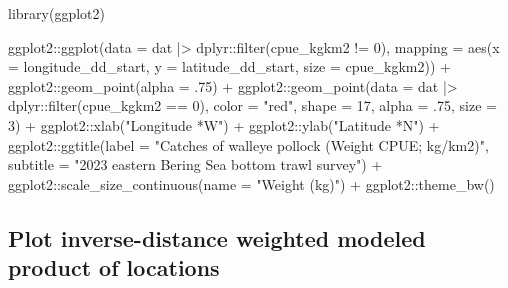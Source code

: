 \documentclass[
  letterpaper,
  oneside,
  open=any]{scrbook}
\newenvironment{Shaded}{\begin{snugshade}}{\end{snugshade}}
\newcommand{\AttributeTok}[1]{\textcolor[rgb]{0.40,0.45,0.13}{#1}}
\newcommand{\DecValTok}[1]{\textcolor[rgb]{0.68,0.00,0.00}{#1}}
\newcommand{\FunctionTok}[1]{\textcolor[rgb]{0.28,0.35,0.67}{#1}}
\newcommand{\NormalTok}[1]{\textcolor[rgb]{0.00,0.23,0.31}{#1}}
\newcommand{\SpecialCharTok}[1]{\textcolor[rgb]{0.37,0.37,0.37}{#1}}
\newcommand{\StringTok}[1]{\textcolor[rgb]{0.13,0.47,0.30}{#1}}
\begin{document}
\begin{Shaded}
\begin{Highlighting}[]
\FunctionTok{library}\NormalTok{(ggplot2)}

\NormalTok{ggplot2}\SpecialCharTok{::}\FunctionTok{ggplot}\NormalTok{(}\AttributeTok{data =}\NormalTok{ dat }\SpecialCharTok{|\textgreater{}}\NormalTok{ dplyr}\SpecialCharTok{::}\FunctionTok{filter}\NormalTok{(cpue\_kgkm2 }\SpecialCharTok{!=} \DecValTok{0}\NormalTok{), }
                \AttributeTok{mapping =} \FunctionTok{aes}\NormalTok{(}\AttributeTok{x =}\NormalTok{ longitude\_dd\_start, }
                              \AttributeTok{y =}\NormalTok{ latitude\_dd\_start, }
                              \AttributeTok{size =}\NormalTok{ cpue\_kgkm2)) }\SpecialCharTok{+} 
\NormalTok{  ggplot2}\SpecialCharTok{::}\FunctionTok{geom\_point}\NormalTok{(}\AttributeTok{alpha =}\NormalTok{ .}\DecValTok{75}\NormalTok{) }\SpecialCharTok{+}
\NormalTok{  ggplot2}\SpecialCharTok{::}\FunctionTok{geom\_point}\NormalTok{(}\AttributeTok{data =}\NormalTok{ dat }\SpecialCharTok{|\textgreater{}}\NormalTok{ dplyr}\SpecialCharTok{::}\FunctionTok{filter}\NormalTok{(cpue\_kgkm2 }\SpecialCharTok{==} \DecValTok{0}\NormalTok{), }
                      \AttributeTok{color =} \StringTok{"red"}\NormalTok{, }
                      \AttributeTok{shape =} \DecValTok{17}\NormalTok{,}
                      \AttributeTok{alpha =}\NormalTok{ .}\DecValTok{75}\NormalTok{,}
                      \AttributeTok{size =} \DecValTok{3}\NormalTok{) }\SpecialCharTok{+}
\NormalTok{  ggplot2}\SpecialCharTok{::}\FunctionTok{xlab}\NormalTok{(}\StringTok{"Longitude *W"}\NormalTok{) }\SpecialCharTok{+}
\NormalTok{  ggplot2}\SpecialCharTok{::}\FunctionTok{ylab}\NormalTok{(}\StringTok{"Latitude *N"}\NormalTok{) }\SpecialCharTok{+}
\NormalTok{  ggplot2}\SpecialCharTok{::}\FunctionTok{ggtitle}\NormalTok{(}\AttributeTok{label =} \StringTok{"Catches of walleye pollock (Weight CPUE; kg/km2)"}\NormalTok{, }
                   \AttributeTok{subtitle =} \StringTok{"2023 eastern Bering Sea bottom trawl survey"}\NormalTok{) }\SpecialCharTok{+}
\NormalTok{  ggplot2}\SpecialCharTok{::}\FunctionTok{scale\_size\_continuous}\NormalTok{(}\AttributeTok{name =} \StringTok{"Weight (kg)"}\NormalTok{) }\SpecialCharTok{+} 
\NormalTok{  ggplot2}\SpecialCharTok{::}\FunctionTok{theme\_bw}\NormalTok{()}
\end{Highlighting}
\end{Shaded}

\subsection{Plot inverse-distance weighted modeled product of
locations}\label{plot-inverse-distance-weighted-modeled-product-of-locations}
\end{document}

